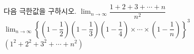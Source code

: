 다음 극한값을 구하시오.
 $\displaystyle\lim_{n\to\infty}\dfrac{1+2+3+\cdots+n}{n^2}$
 $\displaystyle\lim_{n\to\infty}\left\{\left(1-\dfrac{1}{2}\right)\!\left(1-\dfrac{1}{3}\right)\!\left(1-\dfrac{1}{4}\right)\times\cdots\times\left(1-\dfrac{1}{n}\right)\right\}^3$\\ \mbox{}\qquad $(1^2+2^2+3^2+\cdots+n^2)$
